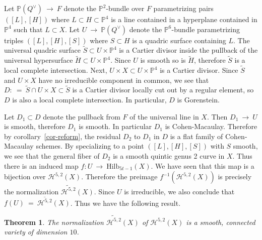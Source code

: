 \documentclass[twoside,12pt,reqno]{amsart}
\theoremstyle{plain}
\newtheorem{thm}{Theorem}[section]
\theoremstyle{definition}
\newcommand{\Hdg}[2]{\mathcal{H}^{#1,#2}}
\newcommand{\PP}{\mathbb{P}}
\newcommand{\Hi}[1]{\text{Hilb}_{#1}}
\def\ps{\vspace{4pt}}
\begin{document}
\ps

Let $\PP(Q^\vee) ~\rightarrow~ F$ denote the $\PP^2$-bundle over $F$
parametrizing pairs $([L],[H])$ where $L\subset H\subset \PP^4$ is a
line contained in a hyperplane contained in $\PP^4$ such that
$L\subset X$.  Let $U~\rightarrow~ \PP(Q^\vee)$ denote the $\PP^6$-bundle
parametrizing triples $([L],[H],[S])$ where $S\subset H$ is a quadric
surface containing $L$.  The universal quadric surface
$\widetilde{S}\subset U\times 
\PP^4$ is a Cartier divisor 
inside the pullback of the universal hypersurface $\widetilde{H}\subset
U\times \PP^4$.  Since $U$ is smooth so is $\widetilde{H}$, therefore
$\widetilde{S}$ is a local complete intersection.  Next, $U\times X\subset
U\times \PP^4$ is a Cartier divisor.  Since $\widetilde{S}$ and $U\times
X$ have no irreducible component in common, we see that $D:~=~\widetilde{S}\cap
U\times X \subset \widetilde{S}$ is a Cartier divisor locally cut out by a
regular element, so $D$ is also a local complete intersection.  In
particular, $D$ is Gorenstein.  

\ps

Let $D_1\subset D$ denote the pullback from $F$ of the universal line
in $X$.  Then $D_1~\rightarrow~ U$ is smooth, therefore $D_1$ is
smooth.  In particular $D_1$ is Cohen-Macaulay.  Therefore by
corollary~\ref{cor-reform}, the residual $D_2$ to $D_1$ in $D$ is a
flat family of 
Cohen-Macaulay schemes.  By specializing to a point $([L],[H],[S])$
with $S$ smooth, we see that the general fiber of $D_2$ is a smooth
quintic genus 2 curve in $X$.  Thus there is an induced map
$f:U~\rightarrow~  \Hi{5t-1}(X)$.  We have seen that this
map is a bijection over $\Hdg{5}{2}(X)$.  Therefore the preimage
$f^{-1}(\Hdg{5}{2}(X))$ is precisely the normalization
$\widetilde{\Hdg{5}{2}}(X)$.  Since $U$ is irreducible, we also 
conclude that $f(U)~=~\overline{\Hdg{5}{2}}(X)$.  Thus we have the
following result.

\ps

\begin{thm}  The normalization $\widetilde{\Hdg{5}{2}}(X)$ of
$\Hdg{5}{2}(X)$ is a smooth, connected variety of dimension $10$.  
\end{thm}



\end{document}
